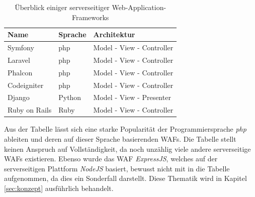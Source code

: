 \begin{table}[H]
	\centering
	\caption{Überblick einiger serverseitiger Web-Application-Frameworks}
	\label{tab:servwaf}
	\begin{tabularx}{0.8\textwidth}{llX}
		\textbf{Name} & \textbf{Sprache} & \textbf{Architektur}   \\ 
		\toprule
		Symfony & php & Model - View - Controller \\
		\rowcolor[HTML]{EFEFEF} 
		Laravel	& php & Model - View - Controller  \\ 
		Phalcon	& php & Model - View - Controller   \\
		\rowcolor[HTML]{EFEFEF}  
		Codeigniter & php & Model - View - Controller \\
		Django & Python & Model - View - Presenter \\	
		\rowcolor[HTML]{EFEFEF} 	
		Ruby on Rails & Ruby & Model - View - Controller \\
		\hline 
	\end{tabularx} 
\end{table}


Aus der Tabelle lässt sich eine starke Popularität der Programmiersprache \emph{php} ableiten und deren auf dieser Sprache basierenden WAFs. Die Tabelle stellt keinen Anspruch auf Vollständigkeit, da noch unzählig viele andere serverseitige WAFs existieren. Ebenso wurde das WAF \emph{ExpressJS}, welches auf der serverseitigen Plattform \emph{NodeJS} basiert, bewusst nicht mit in die Tabelle aufgenommen, da dies ein Sonderfall darstellt. Diese Thematik wird in Kapitel \ref{sec:konzept} ausführlich behandelt. 
